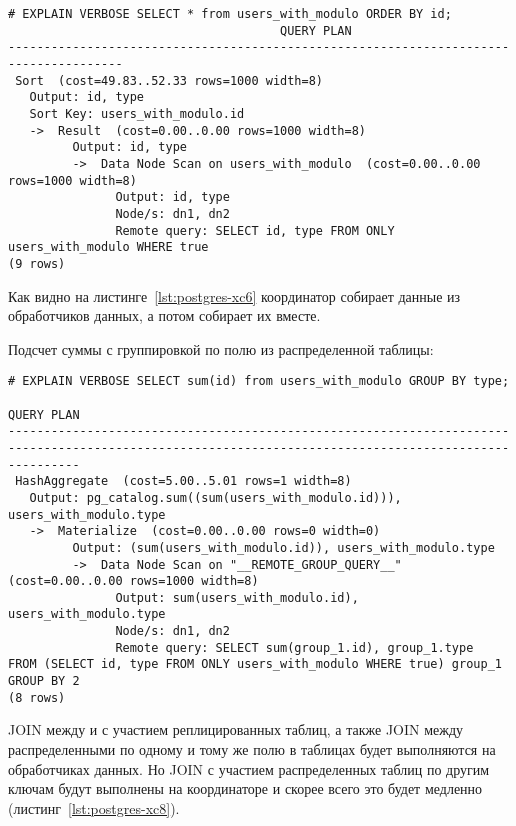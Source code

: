 \begin{lstlisting}[label=lst:postgres-xc6,caption=Выборка записей из распределенной таблицы]
# EXPLAIN VERBOSE SELECT * from users_with_modulo ORDER BY id;
                                      QUERY PLAN                                      
--------------------------------------------------------------------------------------
 Sort  (cost=49.83..52.33 rows=1000 width=8)
   Output: id, type
   Sort Key: users_with_modulo.id
   ->  Result  (cost=0.00..0.00 rows=1000 width=8)
         Output: id, type
         ->  Data Node Scan on users_with_modulo  (cost=0.00..0.00 rows=1000 width=8)
               Output: id, type
               Node/s: dn1, dn2
               Remote query: SELECT id, type FROM ONLY users_with_modulo WHERE true
(9 rows)
\end{lstlisting}

Как видно на листинге~\ref{lst:postgres-xc6} координатор собирает данные из обработчиков данных, а потом собирает их вместе. 

Подсчет суммы с группировкой по полю из распределенной таблицы:

\begin{lstlisting}[label=lst:postgres-xc7,caption=Выборка записей из распределенной таблицы]
# EXPLAIN VERBOSE SELECT sum(id) from users_with_modulo GROUP BY type;
                                                                      QUERY PLAN                                                                      
------------------------------------------------------------------------------------------------------------------------------------------------------
 HashAggregate  (cost=5.00..5.01 rows=1 width=8)
   Output: pg_catalog.sum((sum(users_with_modulo.id))), users_with_modulo.type
   ->  Materialize  (cost=0.00..0.00 rows=0 width=0)
         Output: (sum(users_with_modulo.id)), users_with_modulo.type
         ->  Data Node Scan on "__REMOTE_GROUP_QUERY__"  (cost=0.00..0.00 rows=1000 width=8)
               Output: sum(users_with_modulo.id), users_with_modulo.type
               Node/s: dn1, dn2
               Remote query: SELECT sum(group_1.id), group_1.type  FROM (SELECT id, type FROM ONLY users_with_modulo WHERE true) group_1 GROUP BY 2  
(8 rows)
\end{lstlisting}

JOIN между и с участием реплицированных таблиц, а также JOIN между распределенными по одному и тому же полю в таблицах будет выполняются на обработчиках данных. Но JOIN с участием распределенных таблиц по другим ключам будут выполнены на координаторе и скорее всего это будет медленно (листинг~\ref{lst:postgres-xc8}).

